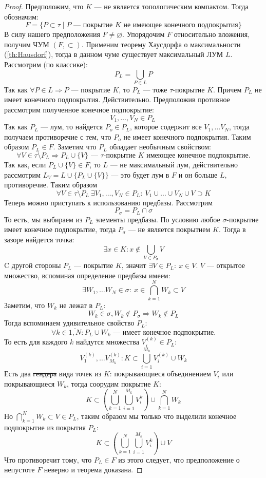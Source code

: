 \begin{proof}
	Предположим, что $K$ --- не является топологическим компактом. Тогда обозначим:
	$$
	F = \{P \subset \tau \mid P \text{ --- покрытие $K$ не имеющее конечного подпокрытия}\}
	$$
	В силу нашего предположения $F \neq \varnothing$. Упорядочим $F$ относительно вложения, получим ЧУМ $(F, \subset)$. Применим теорему Хаусдорфа о максимальности (\ref{th:Hausdorf}), тогда в данном чуме существует максимальный ЛУМ $L$. Рассмотрим (по классике):
	$$
	P_L = \bigcup_{P \in L }P
	$$
	Так как $\forall P \in L \Rightarrow P$ --- покрытие $K$, то $P_L$ --- тоже $\tau$-покрытие $K$. Причем $P_L$ не имеет конечного подпокрытия. Действительно. Предположив противное рассмотрим полученное конечное подпокрытие:
	$$
	V_1, \dots, V_N  \in P_L\
	$$
	Так как $P_L$ --- лум, то найдется $P_o \in P_L$, которое содержит все $V_1, \dots V_N$, тогда получаем противоречие с тем, что $P_o$ не имеет конечного подпокрытия. Таким образом $P_L \in F$. Заметим что $P_L$ обладает необычным свойством:
	$$
	\forall V \in \tau \setminus P_L \Rightarrow P_L \cup \{V\} \text{ --- $\tau$-покрытие $K$ имеющее конечное подпокрытие.}
	$$
	Так как, если $P_L \cup \{V\} \in F$, то $L$ --- не максимальный лум, действительно рассмотрим $L_V = L \cup \{P_L \cup \{V\}\}$ --- это будет лум в $F$ и он больше $L$, противоречие. 
	Таким образом 
	$$
	\forall V \in \tau \setminus P_L \ \exists V_1, \dots, V_N \in P_L: \ V_1 \cup \dots \cup V_N \cup V \supset K
	$$
	Теперь можно приступать к использованию предбазы. Рассмотрим 
	$$
	P_\sigma = P_L \cap \sigma
	$$
	То есть, мы выбираем из $P_L$ элементы предбазы. По условию любое $\sigma$-покрытие имеет конечное подпокрытие, тогда $P_\sigma$ --- не является покрытием $K$. Тогда в зазоре найдется точка:
	$$
	\exists x \in K: x \notin \bigcup_{V \in P_\sigma} V
	$$
	C другой стороны $P_L$ --- покрытие $K$, значит $\exists V \in P_L: \ x \in V$. $V$ --- открытое множество, вспоминая определение предбазы имеем:
	$$
	\exists W_1, \dots W_N \in \sigma:  \  x \in \bigcap_{k=1}^N W_k \subset V
	$$
	Заметим, что $W_k$ не лежат в $P_L$: 
	$$
	W_k \in \sigma, W_k \notin P_\sigma \Rightarrow W_k \notin P_L
	$$
	Тогда вспоминаем удивительное свойство $P_L$: 
	$$
	\forall k \in \overline{1,N} : P_L\cup W_k \text{ --- имеет конечное подпокрытие.}
	$$
	То есть для каждого $k$ найдутся множества $V_i^{(k)} \in P_L$:
	$$
	V_1^{(k)}, \dots V_{M_k}^{(k)}: K \subset \bigcup_{i=1}^{M_k}V_i^{(k)} \cup W_k 
	$$
	Есть два \sout{гендера} вида точек из $K$: покрывающиеся объединением $V_{i}$ или покрывающиеся $W_k$, тогда соорудим покрытие $K$:
	$$
	K \subset \left(\bigcup_{k = 1}^N \bigcup_{i =1}^{M_k} V_i^{k}\right) \cup \bigcap_{k = 1}^N W_k
	$$
	Но $\bigcap_{k = 1}^N W_k \subset V \in P_L$, таким образом мы только что выделили конечное подпокрытие из покрытия $P_L$:
	$$
	K \subset \left(\bigcup_{k = 1}^N \bigcup_{i =1}^{M_k} V_i^{k}\right) \cup V
	$$
	Что противоречит тому, что $P_L \in F$ из этого следует, что предположение о непустоте $F$ неверно и теорема доказана.
\end{proof}

